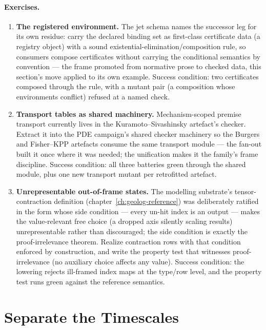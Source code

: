 \paragraph{Exercises.}
\begin{enumerate}
\item \textbf{The registered environment.} The jet schema names the
  successor leg for its own residue: carry the declared binding set as
  first-class certificate data (a registry object) with a sound
  existential-elimination/composition rule, so consumers compose
  certificates without carrying the conditional semantics by
  convention --- the frame promoted from normative prose to checked
  data, this section's move applied to its own example. Success
  condition: two certificates composed through the rule, with a mutant
  pair (a composition whose environments conflict) refused at a named
  check.
\item \textbf{Transport tables as shared machinery.} Mechanism-scoped
  premise transport currently lives in the Kuramoto--Sivashinsky
  artefact's checker. Extract it into the PDE campaign's shared
  checker machinery so the Burgers and Fisher--KPP artefacts consume
  the same transport module --- the fan-out built it once where it was
  needed; the unification makes it the family's frame discipline.
  Success condition: all three batteries green through the shared
  module, plus one new transport mutant per retrofitted artefact.
\item \textbf{Unrepresentable out-of-frame states.} The modelling
  substrate's tensor-contraction definition
  (chapter~\ref{ch:geolog-reference}) was deliberately ratified in the
  form whose side condition --- every un-hit index is an output ---
  makes the value-relevant free choice (a dropped axis silently
  scaling results) unrepresentable rather than discouraged; the side
  condition is exactly the proof-irrelevance theorem. Realize
  contraction rows with that condition enforced by construction, and
  write the property test that witnesses proof-irrelevance (no
  auxiliary choice affects any value). Success condition: the lowering
  rejects ill-framed index maps at the type/row level, and the
  property test runs green against the reference semantics.
\end{enumerate}

\section{Separate the Timescales}
\label{sec:ckbk-timescales}

